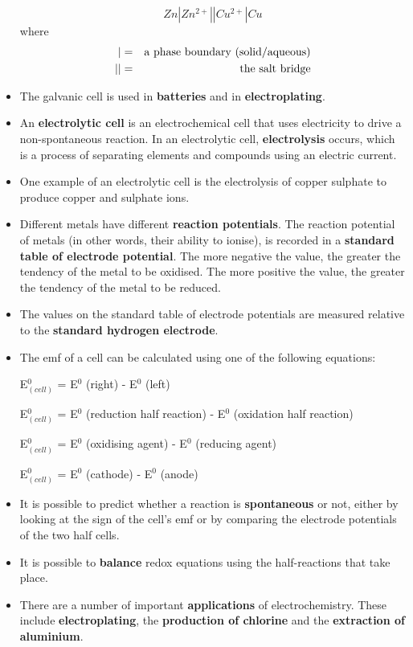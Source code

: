 \begin{itemize}
{\begin{equation*}
Zn|Zn^{2+}||Cu^{2+}|Cu
\end{equation*}
where
\begin{eqnarray*}
  | &=& \rm{a \ phase \ boundary \ (solid/aqueous)}\\
  || & = & \rm{the \ salt \ bridge}
\end{eqnarray*}
}
\item{The galvanic cell is used in \textbf{batteries} and in \textbf{electroplating}.}
\item{An \textbf{electrolytic cell} is an electrochemical cell that uses electricity to drive a non-spontaneous reaction. In an electrolytic cell, \textbf{electrolysis} occurs, which is a process of separating elements and compounds using an electric current.}
\item{One example of an electrolytic cell is the electrolysis of copper sulphate to produce copper and sulphate ions.}
\item{Different metals have different \textbf{reaction potentials}. The reaction potential of metals (in other words, their ability to ionise), is recorded in a \textbf{standard table of electrode potential}. The more negative the value, the greater the tendency of the metal to be oxidised. The more positive the value, the greater the tendency of the metal to be reduced.}
\item{The values on the standard table of electrode potentials are measured relative to the \textbf{standard hydrogen electrode}.}
\item{The emf of a cell can be calculated using one of the following equations:

E$^{0}_{(cell)}$ = E$^{0}$ (right) - E$^{0}$ (left)

E$^{0}_{(cell)}$ = E$^{0}$ (reduction half reaction) - E$^{0}$ (oxidation half reaction)

E$^{0}_{(cell)}$ = E$^{0}$ (oxidising agent) - E$^{0}$ (reducing agent)

E$^{0}_{(cell)}$ = E$^{0}$ (cathode) - E$^{0}$ (anode)
}
\item{It is possible to predict whether a reaction is \textbf{spontaneous} or not, either by looking at the sign of the cell's emf or by comparing the electrode potentials of the two half cells.}
\item{It is possible to \textbf{balance} redox equations using the half-reactions that take place.}
\item{There are a number of important \textbf{applications} of electrochemistry. These include \textbf{electroplating}, the \textbf{production of chlorine} and the \textbf{extraction of aluminium}.}
\end{itemize}

